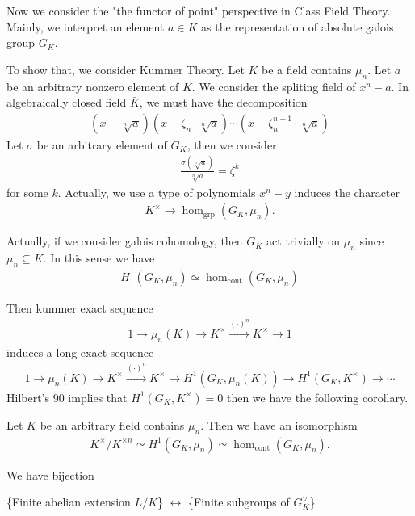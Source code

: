 {Now we consider the "the functor of point" perspective in Class Field Theory.  Mainly, we interpret an element $a\in K$ as the representation of absolute galois group $G_K$.

To show that, we consider Kummer Theory. Let $K$ be a field contains $\mu_n$. Let $a$ be an arbitrary nonzero element of $K$.
We consider the spliting field of $x^n-a$.
In algebraically closed field $\bar{K}$, we must have the decomposition
\begin{align*}
    (x-\sqrt[n]{a})(x-\zeta_n\cdot \sqrt[n]{a})\cdots (x-\zeta_n^{n-1}\cdot \sqrt[n]{a})
\end{align*}
Let $\sigma$ be an arbitrary element of $G_K$, then we consider 
\begin{align*}
    \frac{\sigma(\sqrt[n]{a})}{\sqrt[n]{a}} = \zeta^{k}
\end{align*}
for some $k$. Actually, we use a type of polynomials $x^n-y$ induces the character
\begin{align*}
    K^\times \to \hom_{\text{grp}}(G_K,\mu_n).
\end{align*}

Actually, if we consider galois cohomology, then $G_K$ act trivially on $\mu_n$ since $\mu_n\subseteq K$.
In this sense we have 
\begin{align*}
    H^1(G_K,\mu_n) \simeq \hom_{\text{cont}}(G_K,\mu_n)
\end{align*}

Then kummer exact sequence 
\begin{align*}
    1\to \mu_n(K) \to K^\times \xrightarrow{(\cdot)^n} K^{\times} \to 1
\end{align*} 
induces a long exact sequence 
\begin{align*}
    1\to \mu_n(K) \to K^\times \xrightarrow{(\cdot)^n} K^{\times} \to H^1(G_K,\mu_n(K)) \to H^1(G_K,K^\times) \to \cdots
\end{align*}
Hilbert's 90 implies that $H^1(G_K,K^\times)=0$ then we have the following corollary.
\begin{corollary}
    Let $K$ be an arbitrary field contains $\mu_n$. Then we have an isomorphism 
    \begin{align*}
        K^\times/K^{\times n} \simeq H^1(G_K,\mu_n) \simeq \hom_{\text{cont}}(G_K,\mu_n). 
    \end{align*}
\end{corollary}

We have bijection 
\begin{center}
    \{Finite abelian extension $L/K$\} $\leftrightarrow$  \{Finite subgroups of $G_K^\vee$\}
\end{center}


}
